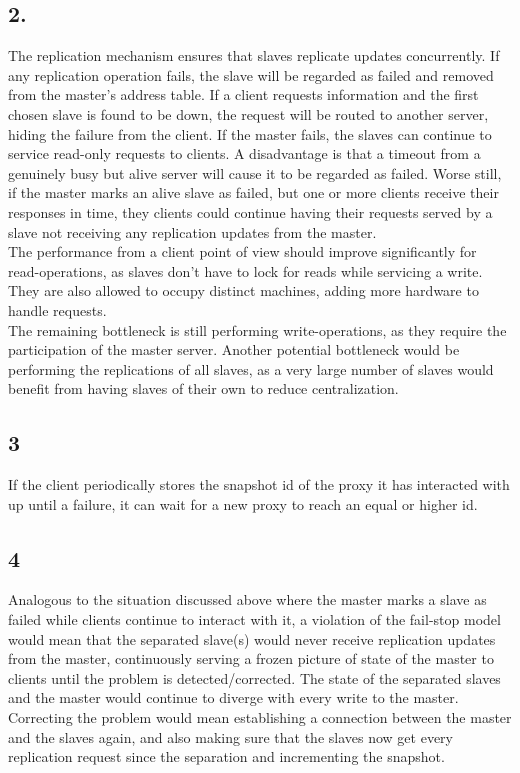 \documentclass[12pt]{article}
\begin{document}
\subsection*{2.}
The replication mechanism ensures that slaves replicate updates concurrently. If any replication operation fails, the slave will be regarded as failed and removed from the master's address table. If a client requests information and the first chosen slave is found to be down, the request will be routed to another server, hiding the failure from the client. If the master fails, the slaves can continue to service read-only requests to clients. A disadvantage is that a timeout from a genuinely busy but alive server will cause it to be regarded as failed. Worse still, if the master marks an alive slave as failed, but one or more clients receive their responses in time, they clients could continue having their requests served by a slave not receiving any replication updates from the master. \\
The performance from a client point of view should improve significantly for read-operations, as slaves don't have to lock for reads while servicing a write. They are also allowed to occupy distinct machines, adding more hardware to handle requests. \\
The remaining bottleneck is still performing write-operations, as they require the participation of the master server. Another potential bottleneck would be performing the replications of all slaves, as a very large number of slaves would benefit from having slaves of their own to reduce centralization.

\subsection*{3}
If the client periodically stores the snapshot id of the proxy it has interacted with up until a failure, it can wait for a new proxy to reach an equal or higher id.

\subsection*{4}
Analogous to the situation discussed above where the master marks a slave as failed while clients continue to interact with it, a violation of the fail-stop model would mean that the separated slave(s) would never receive replication updates from the master, continuously serving a frozen picture of state of the master to clients until the problem is detected/corrected. The state of the separated slaves and the master would continue to diverge with every write to the master. Correcting the problem would mean establishing a connection between the master and the slaves again, and also making sure that the slaves now get every replication request since the separation and incrementing the snapshot.
\end{document}
